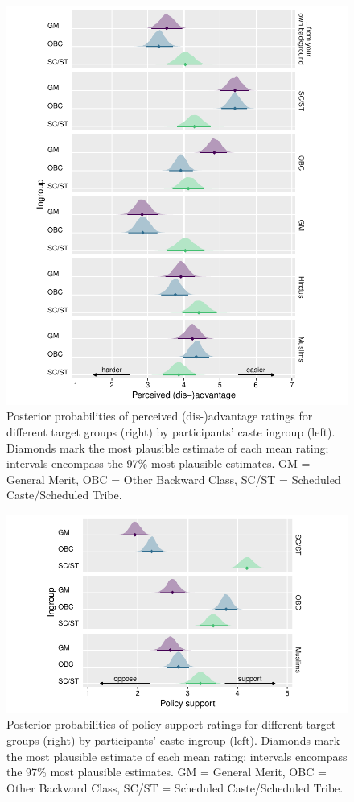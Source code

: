 \documentclass[12pt, a4paper]{article}
\begin{document}
\begin{figure}
\centering
\includegraphics[scale=1]{../figures/figure-7}
\caption{
Posterior probabilities of perceived (dis-)advantage ratings for different target groups (right) by participants' caste ingroup (left). Diamonds mark the most plausible estimate of each mean rating; intervals encompass the 97\% most plausible estimates. GM = General Merit, OBC = Other Backward Class, SC/ST = Scheduled Caste/Scheduled Tribe.
}
\label{fig:f7}
\end{figure}

\begin{figure}
\centering
\includegraphics[scale=1]{../figures/figure-8}
\caption{
Posterior probabilities of policy support ratings for different target groups (right) by participants' caste ingroup (left). Diamonds mark the most plausible estimate of each mean rating; intervals encompass the 97\% most plausible estimates. GM = General Merit, OBC = Other Backward Class, SC/ST = Scheduled Caste/Scheduled Tribe.
}
\label{fig:f8}
\end{figure}
\end{document}
